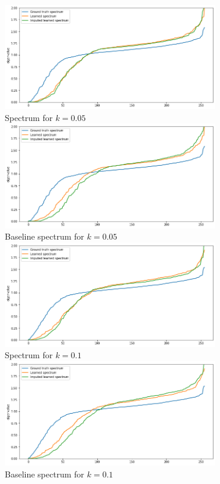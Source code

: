 \documentclass[a4paper]{article}
\begin{document}
\begin{center}
\includegraphics[width=0.70\textwidth]{images/5_percent_own_spectrum.png}\\
Spectrum for $k = 0.05$\\
\includegraphics[width=0.70\textwidth]{images/5_percent_baseline_spectrum.png}\\
Baseline spectrum for $k = 0.05$\\
\includegraphics[width=0.70\textwidth]{images/10_percent_own_spectra.png}\\
Spectrum for $k = 0.1$\\
\includegraphics[width=0.70\textwidth]{images/10_percent_baseline_spectra.png}\\
Baseline spectrum for $k = 0.1$\\
\end{center}
\end{document}
